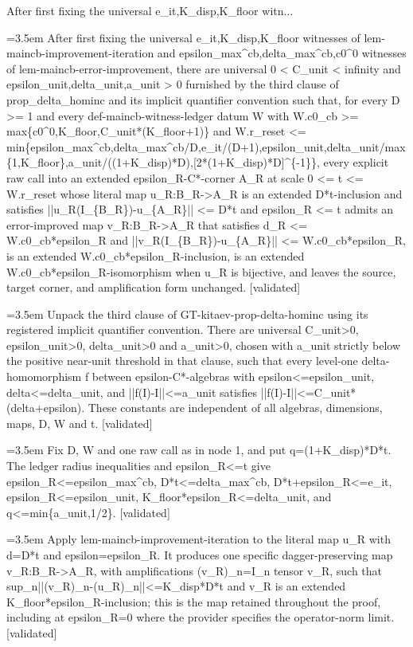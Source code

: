 \documentclass{article}
\newcommand{\step}[1]{\par\noindent\hangindent=3.5em\hangafter=1%
  \makebox[3.5em][l]{\textbf{#1.}}}
\newcommand{\steptag}[1]{\hfill{\small\textsf{[#1]}}}
\begin{document}
\begin{proofbox}{After first fixing the universal e\_it,K\_disp,K\_floor witn...}
\step{1} After first fixing the universal e\_it,K\_disp,K\_floor witnesses of lem-maincb-improvement-iteration and epsilon\_max\textasciicircum{}cb,delta\_max\textasciicircum{}cb,c0\textasciicircum{}0 witnesses of lem-maincb-error-improvement, there are universal 0 < C\_unit < infinity and epsilon\_unit,delta\_unit,a\_unit > 0 furnished by the third clause of prop\_delta\_hominc and its implicit quantifier convention such that, for every D >= 1 and every def-maincb-witness-ledger datum W with W.c0\_cb >= max\{c0\textasciicircum{}0,K\_floor,C\_unit*(K\_floor+1)\} and W.r\_reset <= min\{epsilon\_max\textasciicircum{}cb,delta\_max\textasciicircum{}cb/D,e\_it/(D+1),epsilon\_unit,delta\_unit/max\{1,K\_floor\},a\_unit/((1+K\_disp)*D),[2*(1+K\_disp)*D]\textasciicircum{}\{-1\}\}, every explicit raw call into an extended epsilon\_R-C*-corner A\_R at scale 0 <= t <= W.r\_reset whose literal map u\_R:B\_R->A\_R is an extended D*t-inclusion and satisfies ||u\_R(I\_\{B\_R\})-u\_\{A\_R\}|| <= D*t and epsilon\_R <= t admits an error-improved map v\_R:B\_R->A\_R that satisfies d\_R <= W.c0\_cb*epsilon\_R and ||v\_R(I\_\{B\_R\})-u\_\{A\_R\}|| <= W.c0\_cb*epsilon\_R, is an extended W.c0\_cb*epsilon\_R-inclusion, is an extended W.c0\_cb*epsilon\_R-isomorphism when u\_R is bijective, and leaves the source, target corner, and amplification form unchanged. \steptag{validated} \\[6pt]
\step{1.1} Unpack the third clause of GT-kitaev-prop-delta-hominc using its registered implicit quantifier convention. There are universal C\_unit>0, epsilon\_unit>0, delta\_unit>0 and a\_unit>0, chosen with a\_unit strictly below the positive near-unit threshold in that clause, such that every level-one delta-homomorphism f between epsilon-C*-algebras with epsilon<=epsilon\_unit, delta<=delta\_unit, and ||f(I)-I||<=a\_unit satisfies ||f(I)-I||<=C\_unit*(delta+epsilon). These constants are independent of all algebras, dimensions, maps, D, W and t. \steptag{validated} \\[4pt]
\step{1.2} Fix D, W and one raw call as in node 1, and put q=(1+K\_disp)*D*t. The ledger radius inequalities and epsilon\_R<=t give epsilon\_R<=epsilon\_max\textasciicircum{}cb, D*t<=delta\_max\textasciicircum{}cb, D*t+epsilon\_R<=e\_it, epsilon\_R<=epsilon\_unit, K\_floor*epsilon\_R<=delta\_unit, and q<=min\{a\_unit,1/2\}. \steptag{validated} \\[4pt]
\step{1.3} Apply lem-maincb-improvement-iteration to the literal map u\_R with d=D*t and epsilon=epsilon\_R. It produces one specific dagger-preserving map v\_R:B\_R->A\_R, with amplifications (v\_R)\_n=I\_n tensor v\_R, such that sup\_n||(v\_R)\_n-(u\_R)\_n||<=K\_disp*D*t and v\_R is an extended K\_floor*epsilon\_R-inclusion; this is the map retained throughout the proof, including at epsilon\_R=0 where the provider specifies the operator-norm limit. \steptag{validated} \\[4pt]

\end{proofbox}
\end{document}
